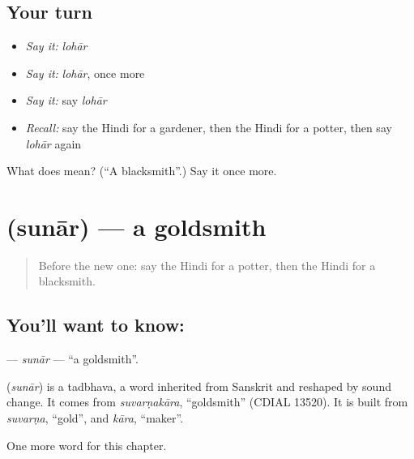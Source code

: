 \subsection*{Your turn}
\begin{itemize}
\raggedright
  \item \emph{Say it:} \emph{lohār}
  \item \emph{Say it:} \emph{lohār}, once more
  \item \emph{Say it:} say \emph{lohār}
  \item \emph{Recall:} say the Hindi for a gardener, then the Hindi for a potter, then say \emph{lohār} again
\end{itemize}

\begin{tcolorbox}[breakable,colback=teal!4,colframe=teal!35!black,title={Before you move on}]
What does  mean? (\textquotedblleft{}A blacksmith\textquotedblright{}.) Say it once more.
\end{tcolorbox}
\section[\texorpdfstring{\hi{सुनार} (sunār)}{सुनार (sunār)}]{ (sunār) — a goldsmith}

\label{lesson:HI-C261-sunar}



\begin{quote}
Before the new one: say the Hindi for a potter, then the Hindi for a blacksmith.
\end{quote}

\subsection*{You'll want to know: }
\textbf{} — \emph{sunār} — \textquotedblleft{}a goldsmith\textquotedblright{}.

\begin{cousinweb}
\textbf{} (\emph{sunār}) is a tadbhava, a word inherited from Sanskrit and reshaped by sound change. It comes from \emph{suvarṇakāra}, \textquotedblleft{}goldsmith\textquotedblright{} (CDIAL 13520). It is built from \emph{suvarṇa}, \textquotedblleft{}gold\textquotedblright{}, and \emph{kāra}, \textquotedblleft{}maker\textquotedblright{}.
\end{cousinweb}

\begin{grammarlens}[title={What you've built}]
One more word for this chapter.
\end{grammarlens}

